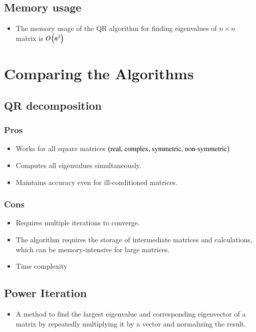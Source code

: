 \documentclass[journal]{IEEEtran}
\begin{document}
\subsection{Memory usage}
\begin{itemize}
    \item The memory usage of the QR algorithm for finding eigenvalues of $n \times n$ matrix is $O\left(n^2\right)$
\end{itemize}
\section{Comparing the Algorithms}

\subsection{QR decomposition\\}
\subsubsection{Pros}
\begin{itemize}
    \item Works for all square matrices $\left(\text{real, complex, symmetric, non-symmetric}\right)$
    \item Computes all eigenvalues simultaneously.
    \item Maintains accuracy even for ill-conditioned matrices.
\end{itemize}
\subsubsection{Cons}
\begin{itemize}
    \item Requires multiple iterations to converge.
    \item The algorithm requires the storage of intermediate matrices and calculations, which can be memory-intensive for large matrices.
    \item Time complexity 
\end{itemize}
\subsection{Power Iteration}
\begin{itemize}
    \item A method to find the largest eigenvalue and corresponding eigenvector of a matrix by repeatedly multiplying it by a vector and normalizing the result.\\
\end{itemize}
\end{document}
